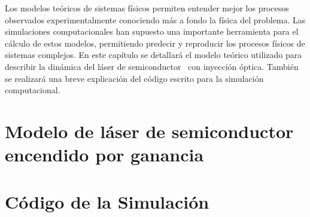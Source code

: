 Los modelos te\'oricos de sistemas f\'isicos permiten entender mejor los procesos observados experimentalmente conociendo m\'as a fondo la f\'isica del problema. Las simulaciones computacionales han supuesto una importante herramienta para el c\'alculo de estos modelos, permitiendo predecir y reproducir los procesos f\'isicos de sistemas complejos. En este cap\'itulo se detallar\'a el modelo te\'orico utilizado para describir la din\'amica del l\'aser de semiconductor \gs\ con inyecci\'on \'optica. Tambi\'en se realizar\'a una breve explicaci\'on del c\'odigo escrito para la simulación computacional.

	\section{Modelo de l\'aser de semiconductor encendido por ganancia}
		\label{Mdl:RoF}
	
		

	\section{Código de la Simulación}
		\label{Mdl:Code}
	
		
